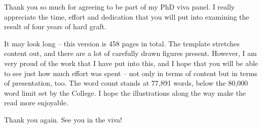 
\begin{preamble}

Thank you so much for agreeing to be part of my PhD viva panel. I really appreciate the time, effort and dedication that you will put into examining the result of four years of hard graft.

It may look long -- this version is 458 pages in total. The template stretches content out, and there are a lot of carefully drawn figures present. However, I am very proud of the work that I have put into this, and I hope that you will be able to see just how much effort was spent -- not only in terms of content but in terms of presentation, too. The word count stands at 77,891 words, below the 80,000 word limit set by the College. I hope the illustrations along the way make the read more enjoyable.

Thank you again. See you in the viva!
\end{preamble}